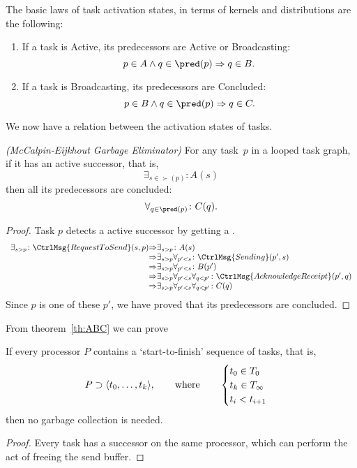 The basic laws of task activation states, in terms of kernels and
distributions are the following:
\begin{enumerate}
\item If a task is Active, its predecessors are Active or Broadcasting:
  \[ p\in A \wedge q\in\pred(p) \Rightarrow q\in B. 
  \]
\item If a task is Broadcasting, its predecessors are Concluded:
  \[ p\in B \wedge q\in\pred(p) \Rightarrow q\in C. \]
\end{enumerate}

We now have a relation between the activation states of tasks.

\begin{theorem}
  \label{th:ABC}
  \textsl{(McCalpin-Eijkhout Garbage Eliminator)}
  For any task~$p$ in a looped task graph, if it has an active successor, that is,
  \[ \exists_{s\in \succ(p)}\colon A(s) \]
  then all its predecessors are concluded:
  \[ \forall_{q\in\pred(p)}\colon C(q). \]
\end{theorem}
\begin{proof}
  Task $p$ detects a active successor by getting a .
  \[ 
  \begin{array}{l@{\Rightarrow}l}
    \exists_{s>p}\colon \CtrlMsg{RequestToSend}(s,p) & \exists_{s>p}\colon A(s)\\
    & \exists_{s>p} \forall_{p'<s} \colon \CtrlMsg{Sending}(p',s)\\
    & \exists_{s>p} \forall_{p'<s} \colon B(p') \\
    & \exists_{s>p} \forall_{p'<s} \forall_{q<p'} \colon \CtrlMsg{AcknowledgeReceipt}(p',q) \\
    & \exists_{s>p} \forall_{p'<s} \forall_{q<p'} \colon C(q) \\
  \end{array}
  \]
  Since $p$ is one of these $p'$, we have proved that its predecessors are concluded.
\end{proof}

From theorem~\ref{th:ABC} we can prove
\begin{theorem}
  \label{th:nogc}
  If every processor $P$ contains a `start-to-finish' sequence of
  tasks, that is,
  \[ P\supset\langle t_0,\ldots,t_k\rangle,\qquad\hbox{where}\qquad
  \begin{cases}
    t_0\in T_0\\ t_k\in T_\infty\\
    t_i < t_{i+1}
  \end{cases}
  \]
  then no garbage collection is needed.
\end{theorem}
\begin{proof}
  Every task has a successor on the same processor, which can perform
  the act of freeing the send buffer.
\end{proof}

